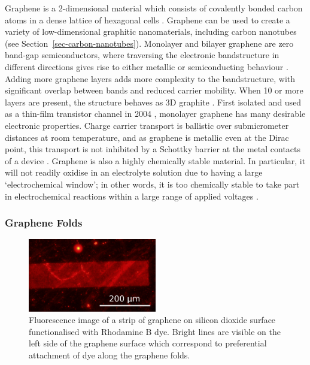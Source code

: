\documentclass[
  a4paper,
]{scrbook}
\begin{document}
Graphene is a 2-dimensional material which consists of covalently bonded
carbon atoms in a dense lattice of hexagonal cells
\autocite{McEuen2002,Novoselov2004,Geim2007,Tran2016}. Graphene can be
used to create a variety of low-dimensional graphitic nanomaterials,
including carbon nanotubes \autocite{McEuen2002} (see
Section~\ref{sec-carbon-nanotubes}). Monolayer and bilayer graphene are
zero band-gap semiconductors, where traversing the electronic
bandstructure in different directions gives rise to either metallic or
semiconducting behaviour \autocite{McEuen2002,Peng2018}. Adding more
graphene layers adds more complexity to the bandstructure, with
significant overlap between bands and reduced carrier mobility. When 10
or more layers are present, the structure behaves as 3D graphite
\autocite{Geim2007,Ohno2015}. First isolated and used as a thin-film
transistor channel in 2004 \autocite{Novoselov2004}, monolayer graphene
has many desirable electronic properties. Charge carrier transport is
ballistic over submicrometer distances at room temperature, and as
graphene is metallic even at the Dirac point, this transport is not
inhibited by a Schottky barrier at the metal contacts of a device
\autocite{Novoselov2004,Geim2007,Peng2018}. Graphene is also a highly
chemically stable material. In particular, it will not readily oxidise
in an electrolyte solution due to having a large `electrochemical
window'; in other words, it is too chemically stable to take part in
electrochemical reactions within a large range of applied voltages
\autocite{Ohno2015,Tran2016}.

\hypertarget{graphene-folds}{%
\subsubsection*{Graphene Folds}\label{graphene-folds}}

\begin{figure}

{\centering \includegraphics[width=0.5\textwidth,height=\textheight]{figures/ch2/modified_NGW8D4_1mM_rhodamineB_centralchannel3_postMsurfactantclean5min_2.4sexposure_20X_221111.png}

}

\caption{\label{fig-graphene-folds}Fluorescence image of a strip of
graphene on silicon dioxide surface functionalised with Rhodamine B dye.
Bright lines are visible on the left side of the graphene surface which
correspond to preferential attachment of dye along the graphene folds.}

\end{figure}
\end{document}
